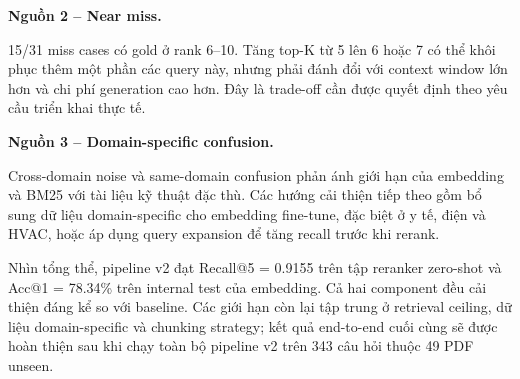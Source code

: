 \documentclass[../DoAn.tex]{subfiles}
\begin{document}
\noindent\textbf{Nguồn 2 -- Near miss.}

15/31 miss cases có gold ở rank 6--10. Tăng top-K từ 5 lên 6 hoặc 7 có thể khôi phục thêm một phần các query này, nhưng phải đánh đổi với context window lớn hơn và chi phí generation cao hơn. Đây là trade-off cần được quyết định theo yêu cầu triển khai thực tế.

\noindent\textbf{Nguồn 3 -- Domain-specific confusion.}

Cross-domain noise và same-domain confusion phản ánh giới hạn của embedding và BM25 với tài liệu kỹ thuật đặc thù. Các hướng cải thiện tiếp theo gồm bổ sung dữ liệu domain-specific cho embedding fine-tune, đặc biệt ở y tế, điện và HVAC, hoặc áp dụng query expansion để tăng recall trước khi rerank.

Nhìn tổng thể, pipeline v2 đạt Recall@5 = 0.9155 trên tập reranker zero-shot và Acc@1 = 78.34\% trên internal test của embedding. Cả hai component đều cải thiện đáng kể so với baseline. Các giới hạn còn lại tập trung ở retrieval ceiling, dữ liệu domain-specific và chunking strategy; kết quả end-to-end cuối cùng sẽ được hoàn thiện sau khi chạy toàn bộ pipeline v2 trên 343 câu hỏi thuộc 49 PDF unseen.
\end{document}
